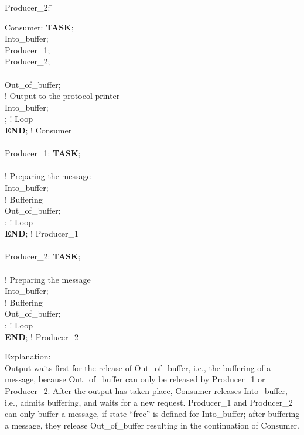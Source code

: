 \begin{tabbing}
\x Producer\_2: \= \kill

\x Consumer: \> {\bf TASK}; \\
    \>  Into\_buffer; \\
    \>  Producer\_1; \\
    \>  Producer\_2; \\
    \> \\
    \> \x {} Out\_of\_buffer;\\
    \> \x \x \x ! Output to the protocol printer\\
    \> \x {} Into\_buffer;\\
    \> ; ! Loop\\
    \> {\bf END}; ! Consumer\\
    \> \\
\x Producer\_1: \> {\bf TASK};\\
  \>  \\
  \> \x \x \x ! Preparing the message \\
  \> \x {} Into\_buffer;\\
  \> \x \x \x ! Buffering\\
  \> \x {} Out\_of\_buffer;\\
  \> ; ! Loop\\
  \> {\bf END}; ! Producer\_1\\
  \> \\
\x Producer\_2: \> {\bf TASK};\\
  \> \\
  \> \x \x \x ! Preparing the message\\
  \> \x {} Into\_buffer;\\
  \> \x \x \x ! Buffering\\
  \> \x {} Out\_of\_buffer;\\
  \> ; ! Loop\\
  \> {\bf END}; ! Producer\_2
\end{tabbing}

Explanation:\\
Output waits first for the release of Out\_of\_buffer, i.e., the
buffering of a message, because Out\_of\_buffer can only be released by
Producer\_1 or Producer\_2. After the output has taken place, Consumer
releases Into\_buffer, i.e., admits buffering, and waits for a new
request. Producer\_1 and Producer\_2 can only buffer a message, if state
``free'' is defined for Into\_buffer; after buffering a message, they
release Out\_of\_buffer resulting in the continuation of Consumer.

